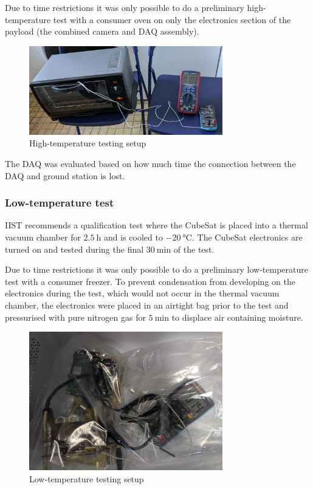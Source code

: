 \documentclass[draft]{report}
\begin{document}
Due to time restrictions it was only possible to do a preliminary high-temperature test with a consumer oven on only the electronics section of the payload (the combined camera and DAQ assembly).

\begin{figure}[H]
  \centering
  \includegraphics[width=0.75\textwidth]{images/oven_test.jpg}
  \caption{High-temperature testing setup}
  \label{fig:temperature-testing-oven}
\end{figure}

The DAQ was evaluated based on how much time the connection between the DAQ and ground station is lost.

\subsubsection{Low-temperature test}
\label{sec:ltemp-test-framework}
IIST recommends a qualification test where the CubeSat is placed into a thermal vacuum chamber for $\SI{2.5}{\hour}$ and is cooled to $\SI{-20}{\degreeCelsius}$. The CubeSat electronics are turned on and tested during the final $\SI{30}{\minute}$ of the test.

Due to time restrictions it was only possible to do a preliminary low-temperature test with a consumer freezer. To prevent condensation from developing on the electronics during the test, which would not occur in the thermal vacuum chamber, the electronics were placed in an airtight bag prior to the test and pressurised with pure nitrogen gas for $\SI{5}{\minute}$ to displace air containing moisture.

\begin{figure}[H]
  \centering
  \includegraphics[width=0.75\textwidth]{images/fridge_test.jpg}
  \caption{Low-temperature testing setup}
  \label{fig:temperature-testing-fridge}
\end{figure}
\end{document}

